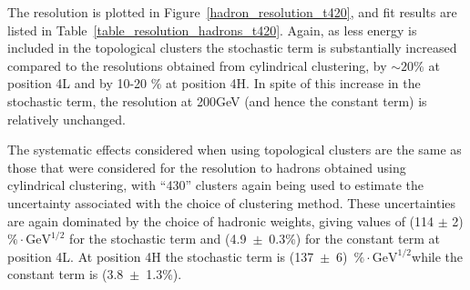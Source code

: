 
The resolution is plotted in Figure~\ref{hadron_resolution_t420}, and fit results are listed in Table~\ref{table_resolution_hadrons_t420}. Again, as less energy is included in the topological clusters the stochastic term is substantially increased compared to the resolutions obtained from cylindrical clustering, by $\sim 20 \%$ at position 4L and by 10-20 $\%$ at position 4H. In spite of this increase in the stochastic term, the resolution at 200GeV (and hence the constant term) is relatively unchanged. 



The systematic effects considered when using topological clusters are the same as those that were considered for the resolution to hadrons obtained using cylindrical clustering, with ``430'' clusters again being used to estimate the uncertainty associated with the choice of clustering method.  These uncertainties are again dominated by the choice of hadronic weights, giving values of (114 $\pm$ 2) $\% \cdot \mathrm{GeV}^{1/2}$ for the stochastic term and (4.9~$\pm$~0.3\%) for the constant term at position 4L. At position 4H the stochastic term is (137~$\pm$~6)~$\% \cdot \mathrm{GeV}^{1/2}$while the constant term is (3.8~$\pm$~1.3\%).





